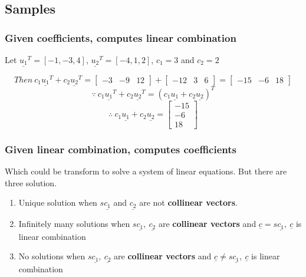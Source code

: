 \documentclass[12pt]{article}
\begin{document}
\subsection{Samples}
\subsubsection{Given coefficients, computes linear combination}
Let $\underline{u_1}^T=[-1,-3,4]$, $\underline{u_2}^T=[-4,1,2]$, $c_1=3$ and $c_2=2$

\begin{equation}
Then\ 
c_1\underline{u_1}^T + c_2\underline{u_2}^T = 
\left[
\begin{array}{ccc}
-3 & -9 & 12
\end{array}
\right] +
\left[
\begin{array}{ccc}
-12 & 3 & 6
\end{array}
\right]
= 
\left[
\begin{array}{ccc}
-15 & -6 & 18
\end{array}
\right]
\end{equation}
\begin{equation}
\because\ c_1\underline{u_1}^T + c_2\underline{u_2}^T = (c_1\underline{u_1} + c_2\underline{u_2})^T
\end{equation}
\begin{equation}
\therefore\ c_1\underline{u_1} + c_2\underline{u_2} = 
\left[
\begin{array}{c}
-15 \\
-6 \\
18
\end{array}
\right]
\end{equation}
\subsubsection{Given linear combination, computes coefficients}
Which could be transform to solve a system of linear equations. But there are three solution.\\
\begin{enumerate}
\item[] Unique solution when $s\underline{c_1}$ and $\underline{c_2}$ are not \textbf{collinear vectors}.
\item[] Infinitely many solutions when $s\underline{c_1},\ \underline{c_2}$ are \textbf{collinear vectors} and $\underline{c}=s\underline{c_1},\ \underline{c}$ is linear combination
\item[] No solutions when  $s\underline{c_1},\ \underline{c_2}$ are \textbf{collinear vectors} and $\underline{c}\neq s\underline{c_1},\ \underline{c}$ is linear combination
\end{enumerate}
\end{document}
